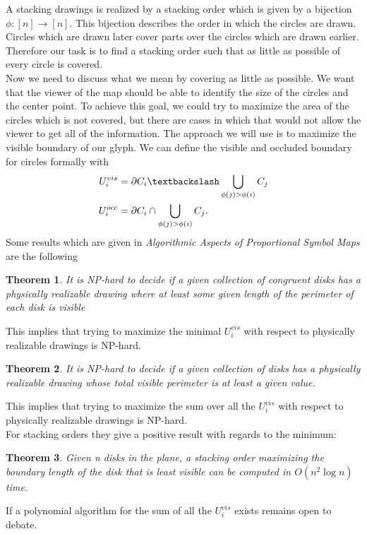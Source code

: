 \documentclass[a4paper,11pt]{article}
\newtheorem{theorem}{Theorem}
\begin{document}
A stacking drawings is realized by a stacking order which is given by a bijection $\phi: [n]\rightarrow [n]$. This bijection describes the order in which the circles are drawn. Circles which are drawn later cover parts over the circles which are drawn earlier. Therefore our task is to find a stacking order such that as little as possible of every circle is covered. \\
Now we need to discuss what we mean by covering as little as possible. We want that the viewer of the map should be able to identify the size of the circles and the center point. To achieve this goal, we could try to maximize the area of the circles which is not covered, but there are cases in which that would not allow the viewer to get all of the information. The approach we will use is to maximize the visible boundary of our glyph. We can define the visible and occluded boundary for circles formally with\\
%
\begin{align*}
  U_i^{vis} & =\partial C_i\textbackslash \bigcup_{\phi(j)>\phi(i)} C_{j} \\
  U_i^{occ} & =\partial C_i \cap \bigcup_{\phi(j)>\phi(i)} C_{j}.
\end{align*}
Some results which are given in \textit{Algorithmic Aspects of Proportional Symbol Maps} are the following
\begin{theorem}
  It is NP-hard to decide if a given collection of congruent disks has a
  physically realizable drawing where at least some given length of the perimeter of
  each disk is visible
\end{theorem}
This implies that trying to maximize the minimal $U_i^{vis}$ with respect to physically realizable drawings is NP-hard.
\begin{theorem}
  It is NP-hard to decide if a given collection of disks has a physically
  realizable drawing whose total visible perimeter is at least a given value.
\end{theorem}
This implies that trying to maximize the sum over all the $U_i^{vis}$ with respect to physically realizable drawings is NP-hard.\\
For stacking orders they give a positive result with regards to the minimum:
\begin{theorem}
  Given n disks in the plane, a stacking order maximizing the boundary
  length of the disk that is least visible can be computed in $O(n^2 \log n)$ time.
\end{theorem}
If a polynomial algorithm for the sum of all the $U_i^{vis}$ exists remains open to debate.\\
\end{document}

